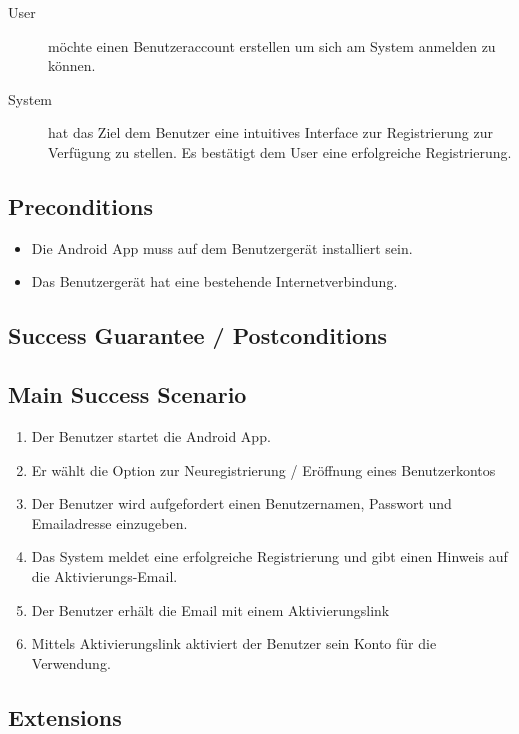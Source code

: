 \documentclass[10pt,a4paper]{scrartcl}
\begin{document}
\begin{description}
\item[User] möchte einen Benutzeraccount erstellen um sich am System anmelden zu können.
\item[System] hat das Ziel dem Benutzer eine intuitives Interface zur Registrierung zur Verfügung zu stellen. Es bestätigt dem User eine erfolgreiche Registrierung.
\end{description}


\subsection*{Preconditions}

\begin{itemize}
\item Die Android App muss auf dem Benutzergerät installiert sein.
\item Das Benutzergerät hat eine bestehende Internetverbindung.
\end{itemize}


\subsection*{Success Guarantee / Postconditions}


\subsection*{Main Success Scenario}

\begin{enumerate}
\item Der Benutzer startet die Android App.
\item Er wählt die Option zur Neuregistrierung / Eröffnung eines Benutzerkontos
\item Der Benutzer wird aufgefordert einen Benutzernamen, Passwort und Emailadresse einzugeben.
\item Das System meldet eine erfolgreiche Registrierung und gibt einen Hinweis auf die Aktivierungs-Email.
\item Der Benutzer erhält die Email mit einem Aktivierungslink
\item Mittels Aktivierungslink aktiviert der Benutzer sein Konto für die Verwendung. 
\end{enumerate}


\subsection*{Extensions}
\end{document}
